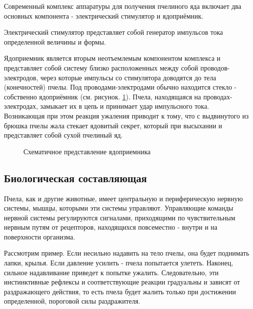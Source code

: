 Современный комплекс аппаратуры для получения пчелиного яда включает два основных компонента - электрический стимулятор и ядоприёмник.

Электрический стимулятор представляет собой генератор импульсов тока определенной величины и формы.

Ядоприемник является вторым неотъемлемым компонентом комплекса и представляет собой систему близко расположенных между собой проводов-электродов, через которые импульсы со стимулятора доводятся до тела (конечностей) пчелы. Под проводами-электродами обычно находится стекло - собственно ядоприёмник (см. рисунок. \ref{img:poison_reciever}). Пчела, находящаяся на проводах-электродах, замыкает их в цепь и принимает удар импульсного тока. Возникающая при этом реакция ужаления приводит к тому, что с выдвинутого из брюшка пчелы жала стекает ядовитый секрет, который при высыхании и представляет собой сухой пчелиный яд.

\begin{figure}[h]
  \caption{Схематичное представление ядоприемника}
  \label{img:poison_reciever}
\end{figure}

\subsection*{Биологическая составляющая}

Пчела, как и другие животные, имеет центральную и периферическую нервную системы, мышцы, которыми эти системы управляют. Управляющие команды нервной системы регулируются сигналами, приходящими по чувствительным нервным путям от рецепторов, находящихся повсеместно - внутри и на поверхности организма.

Рассмотрим пример. Если несильно надавить на тело пчелы, она будет поднимать лапки, крылья. Если давление усилить - пчела попытается улететь. Наконец, сильное надавливание приведет к попытке ужалить. Следовательно, эти инстинктивные рефлексы и соответствующие реакции градуальны и зависят от раздражающего действия, то есть пчела будет жалить только при достижении определенной, пороговой силы раздражителя.

